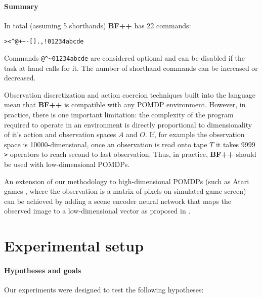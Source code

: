 \paragraph{Summary}
\label{sec:summary}

In total (assuming 5 shorthands) \textbf{BF++} has 22 commands:

\begin{center}
\begin{lstlisting}
><^@+~-[].,!01234abcde
\end{lstlisting}
\end{center}

Commands \verb|@^~01234abcde| are considered optional and can be disabled if the task at hand calls for it.
The number of shorthand commands can be increased or decreased.

Observation discretization and action coercion techniques built into the language mean that \textbf{BF++} is compatible with any POMDP environment. 
However, in practice, there is one important limitation: the complexity of the program required to operate in an environment is directly proportional to dimensionality of it's action and observation spaces $A$ and $O$. 
If, for example the observation space is 10000-dimensional, once an observation is read onto tape $T$ it takes 9999 \verb|>| operators to reach second to last observation.
Thus, in practice, \textbf{BF++} should be used with low-dimensional POMDPs.

An extension of our methodology to high-dimensional POMDPs (such as Atari games \cite{atari}, where the observation is a matrix of pixels on simulated game screen) can be achieved by adding a scene encoder neural network that maps the observed image to a low-dimensional vector as proposed in \cite{daqn}.

\newpage
\section{Experimental setup}
\label{sec:experiments}

\paragraph{Hypotheses and goals}
\label{sec:exgoals}

Our experiments were designed to test the following hypotheses:


